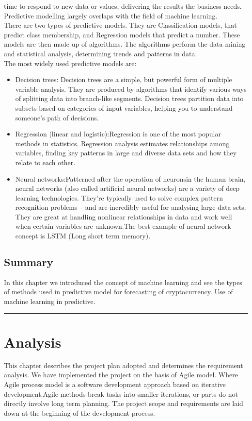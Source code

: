 \documentclass[openany,12pt]{report}
\begin{document}
time to respond to new data or values, delivering the results the business needs. Predictive modelling largely overlaps with the field of machine learning.
\\
There are two types of predictive models. They are Classification models, that predict class membership, and Regression models that predict a number. These models are then made up of algorithms. The algorithms perform the data mining and statistical analysis, determining trends and patterns in data. 
\\
The most widely used predictive models are:
\begin{itemize}
\item{Decision trees:}
Decision trees are a simple, but powerful form of multiple variable analysis. They are produced by algorithms that identify various ways of splitting data into branch-like segments. Decision trees partition data into subsets based on categories of input variables, helping you to understand someone’s path of decisions.
\item{Regression (linear and logistic):}Regression is one of the most popular methods in statistics. Regression analysis estimates relationships among variables, finding key patterns in large and diverse data sets and how they relate to each other.
\item{Neural networks:}Patterned after the operation of neuronsin the human brain, neural networks (also called artificial neural networks) are a variety of deep learning technologies. They’re typically used to solve complex pattern recognition problems – and are incredibly useful for analysing large data sets. They are great at handling nonlinear relationships in data and work well when certain variables are unknown.The best example of neural network concept is LSTM (Long short term memory).\cite{paper7}
\end{itemize}


\section{Summary}
In this chapter we introduced the concept of machine learning and see the types of methods used in predictive model for forecasting of cryptocurrency. Use of machine learning in predictive. 
\vfill
\hrule

\chapter{Analysis}
This chapter describes the project plan adopted and determines the requirement analysis. We have implemented the project on the basis of Agile model.
Where Agile process model is a software development approach based on iterative development.Agile methods break tasks into smaller iterations, or parts do not directly involve long term planning. The project scope and requirements are laid down at the beginning of the development process. 
\end{document}
